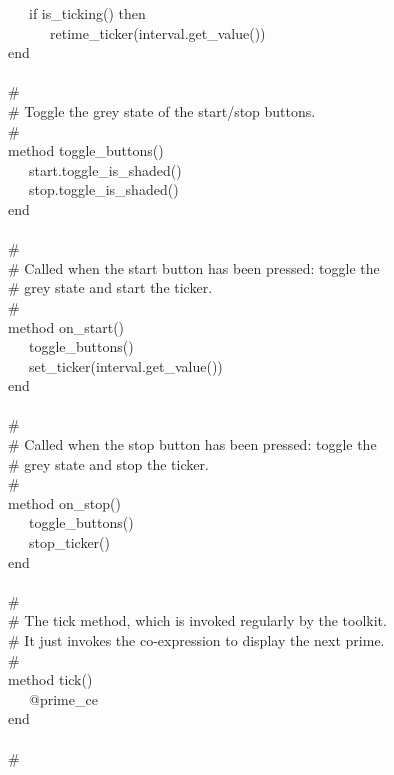 {\>   \ \ \ if is\_ticking() then \\
\>   \ \ \ \ \ \ retime\_ticker(interval.get\_value()) \\
\>   end \\
\ \\
\>   \# \\
\>   \# Toggle the grey state of the start/stop buttons. \\
\>   \# \\
\>   method toggle\_buttons() \\
\>   \ \ \ start.toggle\_is\_shaded() \\
\>   \ \ \ stop.toggle\_is\_shaded() \\
\>   end \\
\ \\
\>   \# \\
\>   \# Called when the start button has been pressed: toggle the \\
\>   \# grey state and start the ticker. \\
\>   \# \\
\>   method on\_start() \\
\>   \ \ \ toggle\_buttons() \\
\>   \ \ \ set\_ticker(interval.get\_value()) \\
\>   end \\
\ \\
\>   \# \\
\>   \# Called when the stop button has been pressed: toggle the \\
\>   \# grey state and stop the ticker. \\
\>   \#  \\
\>   method on\_stop() \\
\>   \ \ \ toggle\_buttons() \\
\>   \ \ \ stop\_ticker() \\
\>   end \\
\ \\
\>   \# \\
\>   \# The tick method, which is invoked regularly by the toolkit. \\
\>   \# It just invokes the co-expression to display the next prime. \\
\>   \# \\
\>   method tick() \\
\>   \ \ \ @prime\_ce \\
\>   end \\
\ \\
\>   \# \\
}
